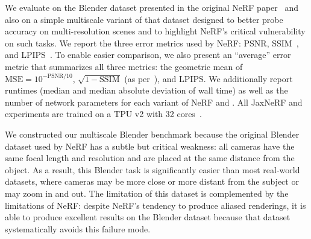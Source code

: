 \documentclass[10pt,twocolumn,letterpaper]{article}
\begin{document}
\begin{table}[]
    \centering
    \vspace{-0.1in}
    \caption{
    A quantitative comparison of \shortmodelnamelower and its ablations against NeRF and several NeRF variants on the test set of our multiscale Blender dataset. See the text for details. 
    }
    \label{tab:avg_multiblender_results}
\end{table}


We evaluate \shortmodelnamelower on the Blender dataset presented in the original NeRF paper~\cite{mildenhall2020} and also on a simple multiscale variant of that dataset designed to better probe accuracy on multi-resolution scenes and to highlight NeRF's critical vulnerability on such tasks. 
We report the three error metrics used by NeRF: PSNR, SSIM~\cite{wang2004image}, and LPIPS~\cite{zhang2018unreasonable}. To enable easier comparison, we also present an ``average'' error metric that summarizes all three metrics: the geometric mean of  $\mathrm{MSE}=10^{-\mathrm{PSNR}/10}$, $\sqrt{1-\mathrm{SSIM}}$ (as per~\cite{brunet2011mathematical}), and $\mathrm{LPIPS}$. We additionally report runtimes (median and median absolute deviation of wall time) as well as the number of network parameters for each variant of NeRF and \shortmodelnamelower. All JaxNeRF and \shortmodelnamelower experiments are trained on a TPU v2 with 32 cores~\cite{jouppi2017datacenter}.

We constructed our multiscale Blender benchmark because the original Blender dataset used by NeRF has a subtle but critical weakness: all cameras have the same focal length and resolution and are placed at the same distance from the object. As a result, this Blender task is significantly easier than most real-world datasets, where cameras may be more close or more distant from the subject or may zoom in and out. The limitation of this dataset is complemented by the limitations of NeRF: despite NeRF's tendency to produce aliased renderings,
it is able to produce excellent results on the Blender dataset because that dataset systematically avoids this failure mode.
\end{document}
